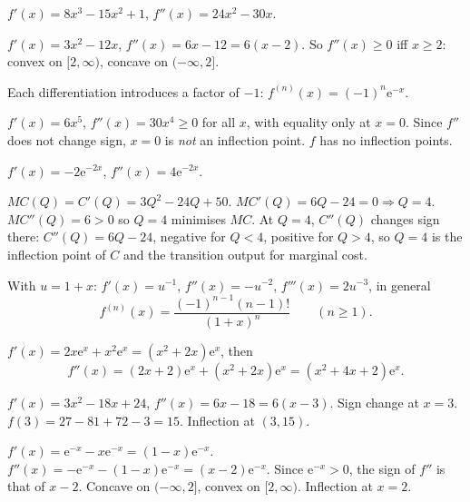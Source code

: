 \begin{solutions}
  \item $f'(x)=8x^{3}-15x^{2}+1$, $f''(x)=24x^{2}-30x$.

  \item $f'(x)=3x^{2}-12x$, $f''(x)=6x-12=6(x-2)$. So $f''(x)\geq 0$ iff
        $x\geq 2$: convex on $[2,\infty)$, concave on $(-\infty,2]$.

  \item Each differentiation introduces a factor of $-1$:
        $f^{(n)}(x)=(-1)^{n}\mathrm{e}^{-x}$.

  \item $f'(x)=6x^{5}$, $f''(x)=30x^{4}\geq 0$ for all $x$, with equality
        only at $x=0$. Since $f''$ does not change sign, $x=0$ is
        \emph{not} an inflection point. $f$ has no inflection points.

  \item $f'(x)=-2\mathrm{e}^{-2x}$, $f''(x)=4\mathrm{e}^{-2x}$.

  \item $MC(Q)=C'(Q)=3Q^{2}-24Q+50$. $MC'(Q)=6Q-24=0\Rightarrow Q=4$.
        $MC''(Q)=6>0$ so $Q=4$ minimises $MC$. At $Q=4$, $C''(Q)$ changes
        sign there: $C''(Q)=6Q-24$, negative for $Q<4$, positive for
        $Q>4$, so $Q=4$ is the inflection point of $C$ and the transition
        output for marginal cost.

  \item With $u=1+x$: $f'(x)=u^{-1}$, $f''(x)=-u^{-2}$,
        $f'''(x)=2u^{-3}$, in general
        \[
          f^{(n)}(x)=\frac{(-1)^{n-1}(n-1)!}{(1+x)^{n}}\qquad (n\geq 1) .
        \]

  \item $f'(x)=2x\mathrm{e}^{x}+x^{2}\mathrm{e}^{x}=(x^{2}+2x)\mathrm{e}^{x}$,
        then
        \[
          f''(x)=(2x+2)\mathrm{e}^{x}+(x^{2}+2x)\mathrm{e}^{x}
                =(x^{2}+4x+2)\mathrm{e}^{x} .
        \]

  \item $f'(x)=3x^{2}-18x+24$, $f''(x)=6x-18=6(x-3)$. Sign change at
        $x=3$. $f(3)=27-81+72-3=15$. Inflection at $(3,15)$.

  \item $f'(x)=\mathrm{e}^{-x}-x\mathrm{e}^{-x}=(1-x)\mathrm{e}^{-x}$.
        $f''(x)=-\mathrm{e}^{-x}-(1-x)\mathrm{e}^{-x}=(x-2)\mathrm{e}^{-x}$.
        Since $\mathrm{e}^{-x}>0$, the sign of $f''$ is that of $x-2$.
        Concave on $(-\infty,2]$, convex on $[2,\infty)$. Inflection at
        $x=2$.


\end{solutions}
